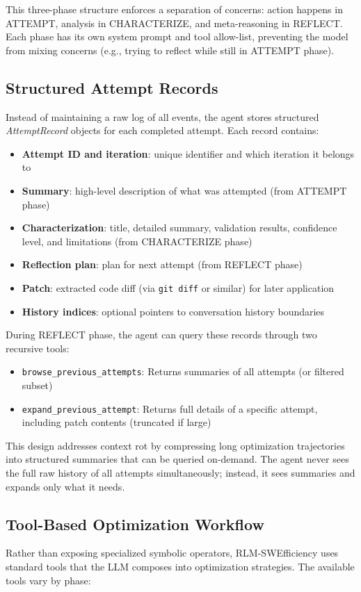 \documentclass{article}
\theoremstyle{plain}
\theoremstyle{definition}
\theoremstyle{remark}
\begin{document}
This three-phase structure enforces a separation of concerns: action happens in ATTEMPT, analysis in CHARACTERIZE, and meta-reasoning in REFLECT. Each phase has its own system prompt and tool allow-list, preventing the model from mixing concerns (e.g., trying to reflect while still in ATTEMPT phase).

\subsection{Structured Attempt Records}
Instead of maintaining a raw log of all events, the agent stores structured \emph{AttemptRecord} objects for each completed attempt. Each record contains:
\begin{itemize}
    \item \textbf{Attempt ID and iteration}: unique identifier and which iteration it belongs to
    \item \textbf{Summary}: high-level description of what was attempted (from ATTEMPT phase)
    \item \textbf{Characterization}: title, detailed summary, validation results, confidence level, and limitations (from CHARACTERIZE phase)
    \item \textbf{Reflection plan}: plan for next attempt (from REFLECT phase)
    \item \textbf{Patch}: extracted code diff (via \texttt{git diff} or similar) for later application
    \item \textbf{History indices}: optional pointers to conversation history boundaries
\end{itemize}

During REFLECT phase, the agent can query these records through two recursive tools:
\begin{itemize}
    \item \texttt{browse\_previous\_attempts}: Returns summaries of all attempts (or filtered subset)
    \item \texttt{expand\_previous\_attempt}: Returns full details of a specific attempt, including patch contents (truncated if large)
\end{itemize}

This design addresses context rot by compressing long optimization trajectories into structured summaries that can be queried on-demand. The agent never sees the full raw history of all attempts simultaneously; instead, it sees summaries and expands only what it needs.

\subsection{Tool-Based Optimization Workflow}
Rather than exposing specialized symbolic operators, RLM-SWEfficiency uses standard tools that the LLM composes into optimization strategies. The available tools vary by phase:
\end{document}
